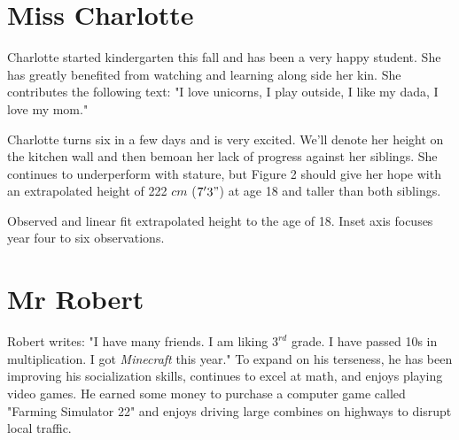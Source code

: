 \documentclass[letterpaper,11pt]{article}
\makeatletter
\newenvironment{figurehere}
  {\def\@captype{figure}}
  {}
\makeatother
\begin{document}
\begin{multicols}{2}
\section{Miss Charlotte}

Charlotte started kindergarten this fall and has been a very happy student.  She
has greatly benefited from watching and learning along side her kin. She contributes
the following text: "I love unicorns, I play outside, I like my dada, I love my mom."

Charlotte turns six in a few days and is very excited.  We'll denote her height
on the kitchen wall and then bemoan her lack of progress against her siblings.
She continues to underperform with stature, but Figure 2 should give her hope with an extrapolated
height of 222 $cm$ ($7'3"$) at age 18 and taller than both siblings.

\begin{figurehere}
    \centering   
    \caption{Observed and linear fit extrapolated height to the age of 18. Inset
    axis focuses year four to six observations.}
\end{figurehere}


\section{Mr Robert}

Robert writes: "I have many friends.
I am liking ${3}^{rd}$ grade. I have passed 10s in multiplication.
I got \textit{Minecraft} this year."  To expand on his terseness, he has been improving his
socialization skills, continues to excel at math, and enjoys playing video games.
He earned some money to purchase a computer game called "Farming Simulator 22"
and enjoys driving large combines on highways to disrupt local traffic.


\end{multicols}
\end{document}
